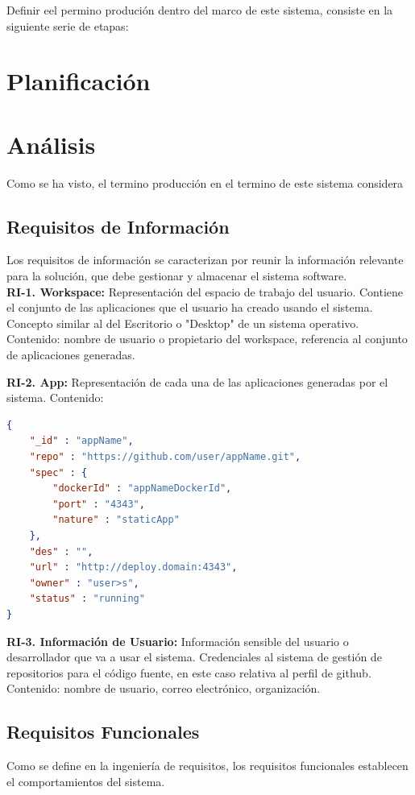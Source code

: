 \documentclass[a4paper,11pt]{book}
\begin{document}
Definir eel permino produción dentro del marco de este sistema, consiste en la siguiente serie de etapas:

\section{Planificación}


\section{Análisis}

Como se ha visto, el termino producción en el termino de este sistema considera 

\subsection{Requisitos de Información }
Los requisitos de información se caracterizan por reunir la información relevante para la solución, que debe gestionar y almacenar el sistema software.\\

\textbf{RI-1. Workspace:} Representación del espacio de trabajo del usuario. Contiene el conjunto de las aplicaciones que el usuario ha creado usando el sistema. Concepto similar al del Escritorio o "Desktop" de un sistema operativo. 
Contenido: nombre de usuario o propietario del workspace, referencia al conjunto de aplicaciones generadas.


\textbf{RI-2. App:} Representación de cada una de las aplicaciones generadas por el sistema. 
Contenido:
\begin{lstlisting}[language=json,firstnumber=1]
{
    "_id" : "appName",
    "repo" : "https://github.com/user/appName.git",
    "spec" : {
        "dockerId" : "appNameDockerId",
        "port" : "4343",
        "nature" : "staticApp"
    },
    "des" : "",
    "url" : "http://deploy.domain:4343",
    "owner" : "user>s",
    "status" : "running"
}
\end{lstlisting}

\textbf{RI-3. Información de Usuario:} Información sensible del usuario o desarrollador que va a usar el sistema. Credenciales al sistema de gestión de repositorios para el código fuente, en este caso relativa al perfil de github. 
Contenido: nombre de usuario, correo electrónico, organización. \\


\subsection{Requisitos Funcionales }
Como se define en la ingeniería de requisitos, los requisitos funcionales establecen el comportamientos del sistema.\\
\end{document}

